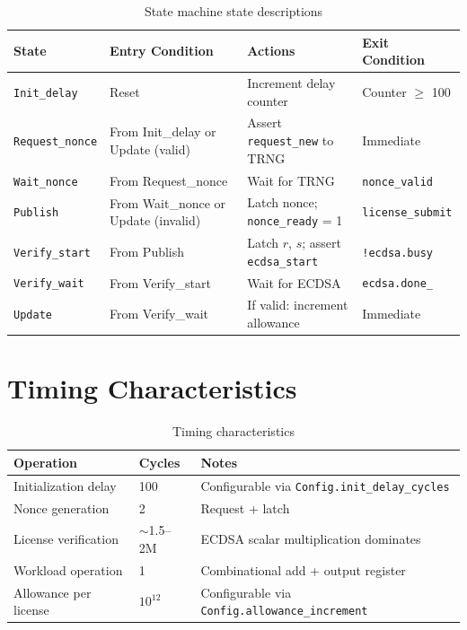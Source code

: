 \documentclass[11pt]{article}
\begin{document}
\begin{table}[h]
\centering
\begin{tabular}{@{}lp{3.5cm}p{4cm}p{3.5cm}@{}}
\toprule
\textbf{State} & \textbf{Entry Condition} & \textbf{Actions} & \textbf{Exit Condition} \\
\midrule
\texttt{Init\_delay} & Reset & Increment delay counter & Counter $\geq$ 100 \\
\midrule
\texttt{Request\_nonce} & From Init\_delay or Update (valid) & Assert \texttt{request\_new} to TRNG & Immediate \\
\midrule
\texttt{Wait\_nonce} & From Request\_nonce & Wait for TRNG & \texttt{nonce\_valid} \\
\midrule
\texttt{Publish} & From Wait\_nonce or Update (invalid) & Latch nonce; \texttt{nonce\_ready} = 1 & \texttt{license\_submit} \\
\midrule
\texttt{Verify\_start} & From Publish & Latch $r$, $s$; assert \texttt{ecdsa\_start} & \texttt{!ecdsa.busy} \\
\midrule
\texttt{Verify\_wait} & From Verify\_start & Wait for ECDSA & \texttt{ecdsa.done\_} \\
\midrule
\texttt{Update} & From Verify\_wait & If valid: increment allowance & Immediate \\
\bottomrule
\end{tabular}
\caption{State machine state descriptions}
\end{table}

\section{Timing Characteristics}

\begin{table}[h]
\centering
\begin{tabular}{@{}llp{7cm}@{}}
\toprule
\textbf{Operation} & \textbf{Cycles} & \textbf{Notes} \\
\midrule
Initialization delay & 100 & Configurable via \texttt{Config.init\_delay\_cycles} \\
\midrule
Nonce generation & 2 & Request + latch \\
\midrule
License verification & $\sim$1.5--2M & ECDSA scalar multiplication dominates \\
\midrule
Workload operation & 1 & Combinational add + output register \\
\midrule
Allowance per license & $10^{12}$ & Configurable via \texttt{Config.allowance\_increment} \\
\bottomrule
\end{tabular}
\caption{Timing characteristics}
\end{table}
\end{document}
